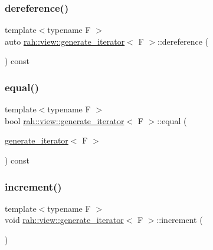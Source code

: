 \subsubsection{\texorpdfstring{dereference()}{dereference()}}
{\footnotesize\ttfamily template$<$typename F $>$ \\
auto \mbox{\hyperlink{structrah_1_1view_1_1generate__iterator}{rah\+::view\+::generate\+\_\+iterator}}$<$ F $>$\+::dereference (\begin{DoxyParamCaption}{ }\end{DoxyParamCaption}) const\hspace{0.3cm}{\ttfamily [inline]}}

\mbox{\label{structrah_1_1view_1_1generate__iterator_acd6b1f8f7d75f1106a6046b3baee4796}} 
\subsubsection{\texorpdfstring{equal()}{equal()}}
{\footnotesize\ttfamily template$<$typename F $>$ \\
bool \mbox{\hyperlink{structrah_1_1view_1_1generate__iterator}{rah\+::view\+::generate\+\_\+iterator}}$<$ F $>$\+::equal (\begin{DoxyParamCaption}\item[{\mbox{\hyperlink{structrah_1_1view_1_1generate__iterator}{generate\+\_\+iterator}}$<$ F $>$}]{ }\end{DoxyParamCaption}) const\hspace{0.3cm}{\ttfamily [inline]}}

\mbox{\label{structrah_1_1view_1_1generate__iterator_aeb0fc0db74bda811fe5d7cb8c6efe1e0}} 
\subsubsection{\texorpdfstring{increment()}{increment()}}
{\footnotesize\ttfamily template$<$typename F $>$ \\
void \mbox{\hyperlink{structrah_1_1view_1_1generate__iterator}{rah\+::view\+::generate\+\_\+iterator}}$<$ F $>$\+::increment (\begin{DoxyParamCaption}{ }\end{DoxyParamCaption})\hspace{0.3cm}{\ttfamily [inline]}}



